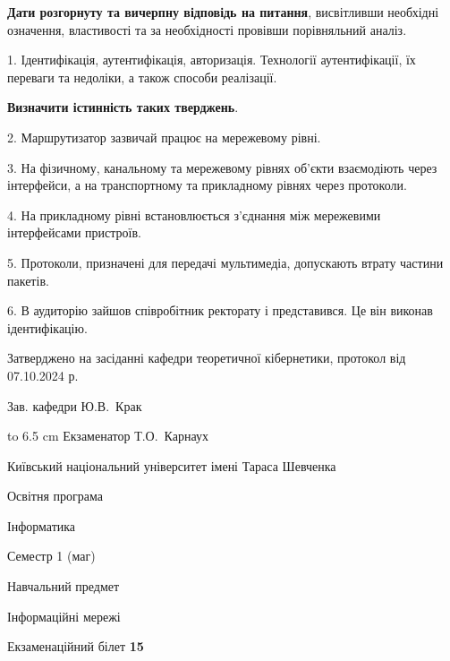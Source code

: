 \documentclass[12pt, ukrainian]{article}
\begin{document}
{
\qquad\textbf{Дати розгорнуту та вичерпну відповідь на питання}, висвітливши необхідні означення, властивості та за необхідності провівши порівняльний аналіз.

1. Ідентифікація, аутентифікація, авторизація. Технології аутентифікації, їх переваги та недоліки, а також способи реалізації.



\qquad\textbf{Визначити істинність таких тверджень}.

2. Маршрутизатор зазвичай працює на мережевому рівні.


3. На фізичному, канальному та мережевому рівнях об'єкти взаємодіють через інтерфейси, а на транспортному та прикладному рівнях через протоколи.


4. На прикладному рівні встановлюється з'єднання між мережевими інтерфейсами пристроїв.


5. Протоколи, призначені для передачі мультимедіа, допускають втрату частини пакетів.


6. В аудиторію зайшов співробітник ректорату і представився. Це він виконав ідентифікацію.

}
{\smallskip\smallskip \begin {scriptsize} Затверджено на засіданні кафедри теоретичної кібернетики, протокол   від   07.10.2024 р.\par\smallskip\smallskip\smallskip\smallskip
{\parbox {6.5 cm} {Зав. кафедри \dotfill Ю.В.~Крак}}\hspace {0.7cm} {\hbox to 6.5 cm { Екзаменатор \dotfill Т.О.~Карнаух}} \end{scriptsize}}
\vspace{0.9cm}
{{\begin {scriptsize}\par
{ \center  Київський національний університет імені Тараса Шевченка \par}
{\parbox {5 cm}{Освітня програма \hfill}{\parbox {7 cm}{Інформатика\hfill}}\parbox {6 cm}{\hfill Семестр 1 (маг)}}\par
{\parbox {5 cm} {Навчальний предмет \hfill}\parbox {7 cm}{Інформаційні мережі \hfill}\parbox {6cm}{\hfill}\par}\vspace{-15pt} \end{scriptsize}}{\center Екзаменаційний білет \No \textbf { 15 }\par}}
\end{document}
